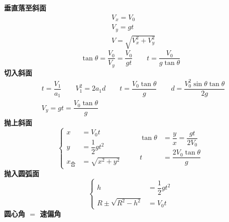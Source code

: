 \textbf{垂直落至斜面}
\begin{align*}
&V_x=V_0\\
&V_y=gt\\
&V=\sqrt{V_x^2+V_y^2}
\end{align*}
\[ \tan\theta=\dfrac{V_0}{V_y}=\dfrac{V_0}{gt}\qquad t=\dfrac{V_0}{g\tan\theta} \]
\textbf{切入斜面}
\begin{align*}
&t=\dfrac{V_1}{a_1}\qquad V_1^2=2a_1d\qquad t=\dfrac{V_0\tan\theta}{g}\qquad d=\dfrac{V_0^2\sin\theta\tan\theta}{2g}\\
&V_y=gt=\dfrac{V_0\tan\theta}{g}
\end{align*}
\textbf{抛上斜面}
\[
\left\{\begin{aligned}
x&=V_0t\\
y&=\dfrac12gt^2\\
x_{\text{合}}&=\sqrt{x^2+y^2}
\end{aligned}\right.
\qquad
\begin{aligned}
\tan\theta&=\dfrac{y}{x}=\dfrac{gt}{2V_0}\\
t&=\dfrac{2V_0\tan\theta}{g}
\end{aligned}
\]
\textbf{抛入圆弧面}
\[
\left\{\begin{aligned}
h&=\dfrac12gt^2\\
R\pm\sqrt{R^2-h^2}&=V_0t
\end{aligned}\right.
\]
\textbf{圆心角 $=$ 速偏角}
